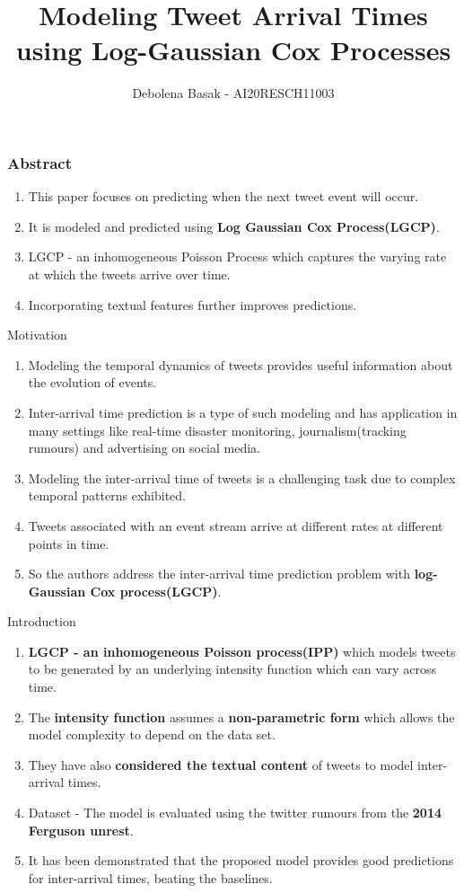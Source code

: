 \documentclass{beamer}
\title{Modeling Tweet Arrival Times using Log-Gaussian Cox Processes}
\author{Debolena Basak - AI20RESCH11003}
\date{}
\begin{document}
\begin{frame}
\titlepage
\end{frame}

\begin{frame}
\frametitle{Abstract}
\begin{block}{}
\begin{enumerate}
    \item This paper focuses on predicting when the next tweet event will occur.
    \item It is modeled and predicted using \textbf{Log Gaussian Cox Process(LGCP)}.
    \item LGCP - an inhomogeneous Poisson Process which captures the varying rate at which the tweets arrive over time.
    \item Incorporating textual features further improves predictions.
\end{enumerate}
\end{block}
\end{frame}

\begin{frame}{Motivation}
\begin{enumerate}
    \item Modeling the temporal dynamics of tweets provides useful information about the evolution of events.
    \item Inter-arrival time prediction is a type of such modeling and has application in many settings like real-time disaster monitoring, journalism(tracking rumours) and advertising on social media.
    \item Modeling the inter-arrival time of tweets is a challenging task due to complex temporal patterns exhibited.
    \item Tweets associated with an event stream arrive at different rates at different points in time.
    \item So the authors address the inter-arrival time prediction problem with \textbf{log-Gaussian Cox process(LGCP)}.
\end{enumerate}
\end{frame}

\begin{frame}{Introduction}
\begin{enumerate}
    \item \textbf{LGCP - an inhomogeneous Poisson process(IPP)} which models tweets to be generated by an underlying intensity function which can vary across time.
    \item The \textbf{intensity function} assumes a \textbf{non-parametric form} which allows the model complexity to depend on the data set.
    \item They have also \textbf{considered the textual content} of tweets to model inter-arrival times.
    \item Dataset - The model is evaluated using the twitter rumours from the \textbf{2014 Ferguson unrest}.
    \item It has been demonstrated that the proposed model provides good predictions for inter-arrival times, beating the baselines.
\end{enumerate}
\end{frame}
\end{document}
